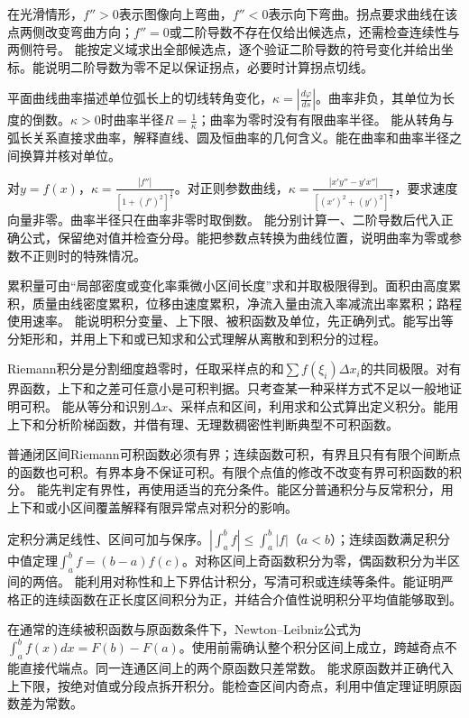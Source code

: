 {在光滑情形，$f''>0$表示图像向上弯曲，$f''<0$表示向下弯曲。拐点要求曲线在该点两侧改变弯曲方向；$f''=0$或二阶导数不存在仅给出候选点，还需检查连续性与两侧符号。}
{能按定义域求出全部候选点，逐个验证二阶导数的符号变化并给出坐标。能说明二阶导数为零不足以保证拐点，必要时计算拐点切线。}

{平面曲线曲率描述单位弧长上的切线转角变化，$\kappa=\left|\frac{d\varphi}{ds}\right|$。曲率非负，其单位为长度的倒数。$\kappa>0$时曲率半径$R=\frac1\kappa$；曲率为零时没有有限曲率半径。}
{能从转角与弧长关系直接求曲率，解释直线、圆及恒曲率的几何含义。能在曲率和曲率半径之间换算并核对单位。}

{对$y=f(x)$，$\kappa=\frac{|f''|}{[1+(f')^2]^{\frac32}}$。对正则参数曲线，$\kappa=\frac{|x'y''-y'x''|}{[(x')^2+(y')^2]^{\frac32}}$，要求速度向量非零。曲率半径只在曲率非零时取倒数。}
{能分别计算一、二阶导数后代入正确公式，保留绝对值并检查分母。能把参数点转换为曲线位置，说明曲率为零或参数不正则时的特殊情况。}

{累积量可由“局部密度或变化率乘微小区间长度”求和并取极限得到。面积由高度累积，质量由线密度累积，位移由速度累积，净流入量由流入率减流出率累积；路程使用速率。}
{能说明积分变量、上下限、被积函数及单位，先正确列式。能写出等分矩形和，并用上下和或已知求和公式理解从离散和到积分的过程。}

{Riemann积分是分割细度趋零时，任取采样点的和$\sum f(\xi_i)\Delta x_i$的共同极限。对有界函数，上下和之差可任意小是可积判据。只考查某一种采样方式不足以一般地证明可积。}
{能从等分和识别$\Delta x$、采样点和区间，利用求和公式算出定义积分。能用上下和分析阶梯函数，并借有理、无理数稠密性判断典型不可积函数。}

{普通闭区间Riemann可积函数必须有界；连续函数可积，有界且只有有限个间断点的函数也可积。有界本身不保证可积。有限个点值的修改不改变有界可积函数的积分。}
{能先判定有界性，再使用适当的充分条件。能区分普通积分与反常积分，用上下和或小区间覆盖解释有限异常点对积分的影响。}

{定积分满足线性、区间可加与保序。$|\int_a^bf|\le\int_a^b|f|$（$a<b$）；连续函数满足积分中值定理$\int_a^bf=(b-a)f(c)$。对称区间上奇函数积分为零，偶函数积分为半区间的两倍。}
{能利用对称性和上下界估计积分，写清可积或连续等条件。能证明严格正的连续函数在正长度区间积分为正，并结合介值性说明积分平均值能够取到。}

{在通常的连续被积函数与原函数条件下，Newton--Leibniz公式为$\int_a^bf(x)dx=F(b)-F(a)$。使用前需确认整个积分区间上成立，跨越奇点不能直接代端点。同一连通区间上的两个原函数只差常数。}
{能求原函数并正确代入上下限，按绝对值或分段点拆开积分。能检查区间内奇点，利用中值定理证明原函数差为常数。}

